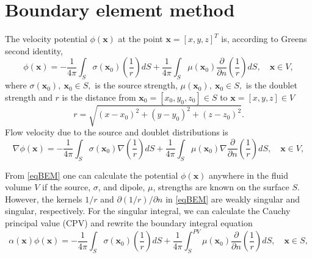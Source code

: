 \documentclass[]{book}
\newcommand{\V}[1]{\boldsymbol{#1}}
\begin{document}
\chapter{Boundary element method}
The velocity potential $\phi(\V{x})$ at the point $\V{x} = \left[x,y,z\right]^T$ is, according to Greens second identity, 
\begin{equation}
	\phi(\V{x}) = 
	- \frac{1}{4 \pi} \int_{S} \sigma (\V{x}_0) \left(\frac{1}{r} \right) dS
	+ \frac{1}{4 \pi} \int_{S} \mu(\V{x}_0)  \frac{\partial }{\partial n} \left( \frac{1}{r}\right) dS, \quad \V{x} \in V,
\label{eqBEM}
\end{equation}
where $\sigma(\V{x}_0),~ \V{x}_0 \in S,$ is the source strength, $\mu(\V{x}_0),~ \V{x}_0 \in S,$ is the doublet strength and $r$ is the distance from $\V{x}_0 = \left[x_0,y_0,z_0\right] \in S$ to $\V{x} = \left[x,y,z\right] \in V$
\begin{equation}
r = \sqrt{(x-x_0)^2 + (y-y_0)^2 + (z-z_0)^2}.
\end{equation}
Flow velocity due to the source and doublet distributions is
\begin{equation}
\nabla \phi(\V{x}) = 
- \frac{1}{4 \pi} \int_{S} \sigma (\V{x}_0) \nabla\left(\frac{1}{r} \right) dS
+ \frac{1}{4 \pi} \int_{S} \mu(\V{x}_0) \nabla \frac{\partial }{\partial n} \left( \frac{1}{r}\right) dS, \quad \V{x} \in V,
\label{eqBEMvel}
\end{equation}

From \ref{eqBEM} one can calculate the potential $\phi(\V{x})$ anywhere in the fluid volume $V$ if the source, $\sigma$, and dipole, $\mu$, strengths are known on the surface $S$. However, the kernels $1/r$ and $ \partial (1/r)/\partial n$ in \ref{eqBEM} are weakly singular and singular, respectively. For the singular integral, we can calculate the Cauchy principal value (CPV) and rewrite the boundary integral equation 
\begin{equation}
\alpha (\V{x}) \phi(\V{x}) = 
- \frac{1}{4 \pi} \int_{S} \sigma (\V{x}_0) \left(\frac{1}{r} \right) dS
+ \frac{1}{4 \pi} \int_{S}^{PV} \mu(\V{x}_0)  \frac{\partial }{\partial n} \left( \frac{1}{r}\right) dS, \quad \V{x} \in S,
\label{eqBEM}
\end{equation}
\end{document}
